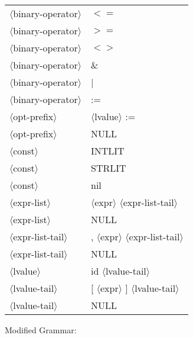 \documentclass[11pt, fleqn]{article}
\newcommand{\atag}[1]{$\langle$#1$\rangle$}
\begin{document}
\begin{longtable}{l|l}
\atag{binary-operator}			&	$<=$	\\
\atag{binary-operator}			&	$>=$	\\
\atag{binary-operator}			&	$<>$	\\
\atag{binary-operator}			&	\&	\\
\atag{binary-operator}			&	|	\\
\atag{binary-operator}			&	:=	\\
\atag{opt-prefix}				&	\atag{lvalue} :=		\\
\atag{opt-prefix}				&	NULL		\\
\atag{const}						&	INTLIT		\\
\atag{const}						&	STRLIT		\\
\atag{const}						&	nil		\\
\atag{expr-list}					&	\atag{expr} \atag{expr-list-tail}		\\
\atag{expr-list}					&	NULL		\\
\atag{expr-list-tail}			&	, \atag{expr} \atag{expr-list-tail}		\\
\atag{expr-list-tail}			&	NULL		\\
\atag{lvalue}					&	id \atag{lvalue-tail}		\\
\atag{lvalue-tail}				&	[ \atag{expr} ] \atag{lvalue-tail}		\\
\atag{lvalue-tail}				&	NULL		\\
\end{longtable}

Modified Grammar:
\end{document}
